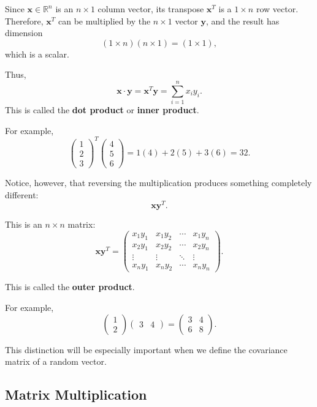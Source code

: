 \documentclass[11pt]{article}
\theoremstyle{definition}
\theoremstyle{plain}
\theoremstyle{remark}
\begin{document}
Since $\mathbf{x}\in\mathbb{R}^n$ is an $n\times 1$ column vector, its transpose $\mathbf{x}^T$ is a $1\times n$ row vector. Therefore, $\mathbf{x}^T$ can be multiplied by the $n\times 1$ vector $\mathbf{y}$, and the result has dimension
\[
(1\times n)(n\times 1)=(1\times 1),
\]
which is a scalar.

Thus,
\[
{\mathbf{x}\cdot\mathbf{y}
=\mathbf{x}^T\mathbf{y}
=\sum_{i=1}^n x_i y_i.}
\]
This is called the \textbf{dot product} or \textbf{inner product}.

For example,
\[
\begin{pmatrix}
1\\
2\\
3
\end{pmatrix}^{T}
\begin{pmatrix}
4\\
5\\
6
\end{pmatrix}
=
1(4)+2(5)+3(6)
=
32.
\]

Notice, however, that reversing the multiplication produces something
completely different:
\[
\mathbf{x}\mathbf{y}^T.
\]

This is an $n\times n$ matrix:
\[
{
\mathbf{x}\mathbf{y}^T
=
\begin{pmatrix}
x_1y_1 & x_1y_2 & \cdots & x_1y_n\\
x_2y_1 & x_2y_2 & \cdots & x_2y_n\\
\vdots & \vdots & \ddots & \vdots\\
x_ny_1 & x_ny_2 & \cdots & x_ny_n
\end{pmatrix}.
}
\]

This is called the \textbf{outer product}.

For example,
\[
\begin{pmatrix}
1\\
2
\end{pmatrix}
\begin{pmatrix}
3&4
\end{pmatrix}
=
\begin{pmatrix}
3&4\\
6&8
\end{pmatrix}.
\]

This distinction will be especially important when we define the
covariance matrix of a random vector.


\subsection*{Matrix Multiplication}
\end{document}
